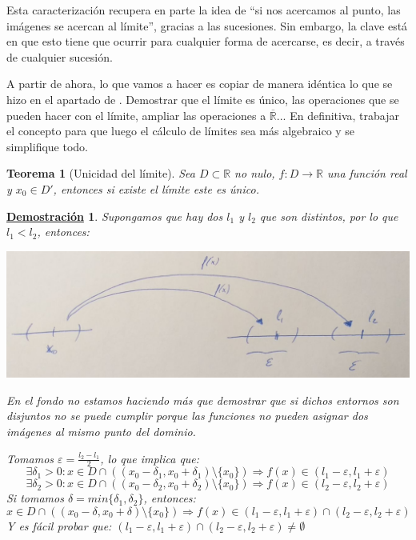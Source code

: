 \documentclass[10pt,a4paper,openright]{book}
\theoremstyle{break}
\newtheorem{theo}{Teorema}[chapter]
\newtheorem*{demo}{\underline{Demostración}}
\begin{document}
Esta caracterización recupera en parte la idea de ``si nos acercamos al punto, las imágenes se acercan al límite'', gracias a las sucesiones. Sin embargo, la clave está en que esto tiene que ocurrir para cualquier forma de acercarse, es decir, a través de cualquier sucesión.

A partir de ahora, lo que vamos a hacer es copiar de manera idéntica lo que se hizo en el apartado de . Demostrar que el límite es único, las operaciones que se pueden hacer con el límite, ampliar las operaciones a $\overline{\mathbb{R}}$... En definitiva, trabajar el concepto para que luego el cálculo de límites sea más algebraico y se simplifique todo.

\begin{theo}[Unicidad del límite]
Sea $D\subset \mathbb R$ no nulo, $f:D\longrightarrow \mathbb R$ una función real y $x_0\in D'$, entonces si existe el límite este es único.
\end{theo}
\begin{demo}
Supongamos que hay dos $l_1$ y $l_2$ que son distintos, por lo que $l_1<l_2$, entonces:

\begin{center}
\includegraphics[scale=0.30]{limite doble}
\end{center}

En el fondo no estamos haciendo más que demostrar que si dichos entornos son disjuntos no se puede cumplir porque las funciones no pueden asignar dos imágenes al mismo punto del dominio.

Tomamos $\varepsilon=\frac{l_2-l_1}{2}$, lo que implica que:
$$\exists \delta_1>0: x\in D\cap \left((x_0-\delta_1, x_0+\delta_1)\mbox{\textbackslash}\{x_0\}\right) \Rightarrow f(x)\in (l_1-\varepsilon, l_1+\varepsilon)$$
$$\exists \delta_2>0: x\in D\cap \left((x_0-\delta_2, x_0+\delta_2)\mbox{\textbackslash}\{x_0\}\right) \Rightarrow f(x)\in (l_2-\varepsilon, l_2+\varepsilon)$$
Si tomamos $\delta=min\{\delta_1, \delta_2\}$, entonces:
$$x\in D\cap \left((x_0-\delta, x_0+\delta)\mbox{\textbackslash}\{x_0\}\right) \Rightarrow f(x)\in (l_1-\varepsilon, l_1+\varepsilon)\cap (l_2-\varepsilon, l_2+\varepsilon)$$
Y es fácil probar que: $(l_1-\varepsilon, l_1+\varepsilon)\cap (l_2-\varepsilon, l_2+\varepsilon)\neq \emptyset$
\end{demo}
\end{document}

